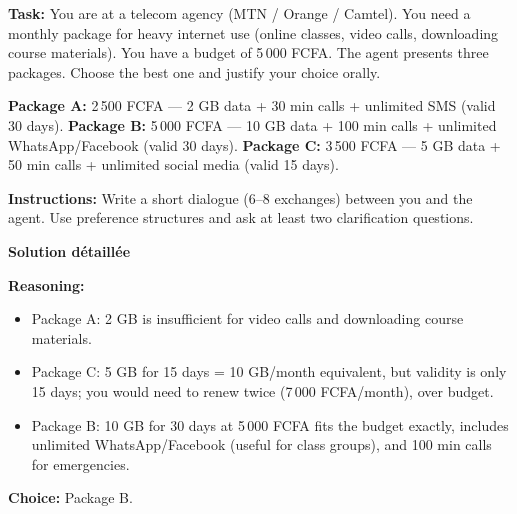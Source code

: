 \documentclass[11pt]{article}
\begin{document}
\begin{exoresolu}
\textbf{Task:} You are at a telecom agency (MTN / Orange / Camtel). You need a monthly package for heavy internet use (online classes, video calls, downloading course materials). You have a budget of 5\,000 FCFA. The agent presents three packages. Choose the best one and justify your choice orally.

\textbf{Package A:} 2\,500 FCFA — 2 GB data + 30 min calls + unlimited SMS (valid 30 days).
\textbf{Package B:} 5\,000 FCFA — 10 GB data + 100 min calls + unlimited WhatsApp/Facebook (valid 30 days).
\textbf{Package C:} 3\,500 FCFA — 5 GB data + 50 min calls + unlimited social media (valid 15 days).

\textbf{Instructions:} Write a short dialogue (6–8 exchanges) between you and the agent. Use preference structures and ask at least two clarification questions.

\tcblower
\textbf{Solution détaillée}

\textbf{Reasoning:}
\begin{itemize}
    \item Package A: 2 GB is insufficient for video calls and downloading course materials.
    \item Package C: 5 GB for 15 days = 10 GB/month equivalent, but validity is only 15 days; you would need to renew twice (7\,000 FCFA/month), over budget.
    \item Package B: 10 GB for 30 days at 5\,000 FCFA fits the budget exactly, includes unlimited WhatsApp/Facebook (useful for class groups), and 100 min calls for emergencies.
\end{itemize}
\textbf{Choice:} Package B.


\end{exoresolu}
\end{document}

